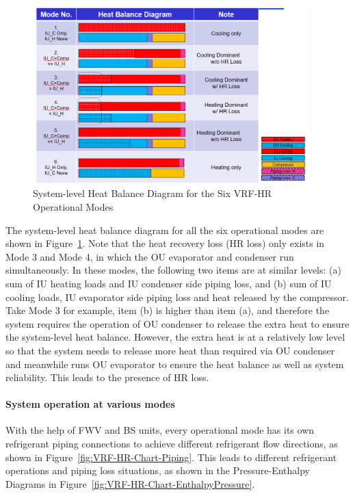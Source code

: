 \begin{figure}[hbtp] %
\centering
\includegraphics[width=0.95\textwidth, height=0.95\textheight, keepaspectratio=true]{media/VRF-HR-Chart-HeatBalance.png}
\caption{System-level Heat Balance Diagram for the Six VRF-HR Operational Modes \label{fig:VRF-HR-Chart-HeatBalance}}
\end{figure}

The system-level heat balance diagram for all the six operational modes are shown in Figure~\ref{fig:VRF-HR-Chart-HeatBalance}. Note that the heat recovery loss (HR loss) only exists in Mode 3 and Mode 4, in which the OU evaporator and condenser run simultaneously. In these modes, the following two items are at similar levels: (a) sum of IU heating loads and IU condenser side piping loss, and (b) sum of IU cooling loads, IU evaporator side piping loss and heat released by the compressor. Take Mode 3 for example, item (b) is higher than item (a), and therefore the system requires the operation of OU condenser to release the extra heat to ensure the system-level heat balance. However, the extra heat is at a relatively low level so that the system needs to release more heat than required via OU condenser and meanwhile runs OU evaporator to ensure the heat balance as well as system reliability. This leads to the presence of HR loss.


\paragraph{System operation at various modes}\label{System-operation-at-various-modes}

With the help of FWV and BS units, every operational mode has its own refrigerant piping connections to achieve different refrigerant flow directions, as shown in Figure~\ref{fig:VRF-HR-Chart-Piping}. This leads to different refrigerant operations and piping loss situations, as shown in the Pressure-Enthalpy Diagrams in Figure~\ref{fig:VRF-HR-Chart-EnthalpyPressure}.

